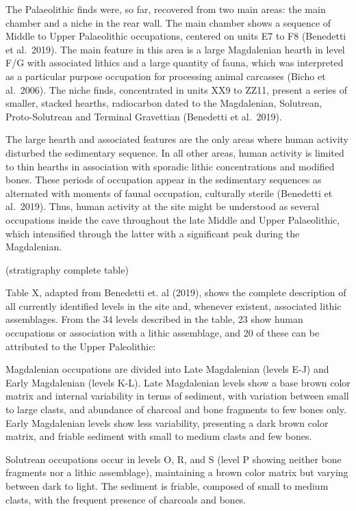 \documentclass[12pt,twoside]{reedthesis}
\begin{document}
The Palaeolithic finds were, so far, recovered from two main areas: the main chamber and a niche in the rear wall. The main chamber shows a sequence of Middle to Upper Palaeolithic occupations, centered on units E7 to F8 (Benedetti et al.~2019). The main feature in this area is a large Magdalenian hearth in level F/G with associated lithics and a large quantity of fauna, which was interpreted as a particular purpose occupation for processing animal carcasses (Bicho et al.~2006). The niche finds, concentrated in units XX9 to ZZ11, present a series of smaller, stacked hearths, radiocarbon dated to the Magdalenian, Solutrean, Proto-Solutrean and Terminal Gravettian (Benedetti et al.~2019).

The large hearth and associated features are the only areas where human activity disturbed the sedimentary sequence. In all other areas, human activity is limited to thin hearths in association with sporadic lithic concentrations and modified bones. These periods of occupation appear in the sedimentary sequences as alternated with moments of faunal occupation, culturally sterile (Benedetti et al.~2019). Thus, human activity at the site might be understood as several occupations inside the cave throughout the late Middle and Upper Palaeolithic, which intensified through the latter with a significant peak during the Magdalenian.

(stratigraphy complete table)

Table X, adapted from Benedetti et. al (2019), shows the complete description of all currently identified levels in the site and, whenever existent, associated lithic assemblages. From the 34 levels described in the table, 23 show human occupations or association with a lithic assemblage, and 20 of these can be attributed to the Upper Paleolithic:

Magdalenian occupations are divided into Late Magdalenian (levels E-J) and Early Magdalenian (levels K-L). Late Magdalenian levels show a base brown color matrix and internal variability in terms of sediment, with variation between small to large clasts, and abundance of charcoal and bone fragments to few bones only. Early Magdalenian levels show less variability, presenting a dark brown color matrix, and friable sediment with small to medium clasts and few bones.

Solutrean occupations occur in levels O, R, and S (level P showing neither bone fragments nor a lithic assemblage), maintaining a brown color matrix but varying between dark to light. The sediment is friable, composed of small to medium clasts, with the frequent presence of charcoals and bones.
\end{document}
